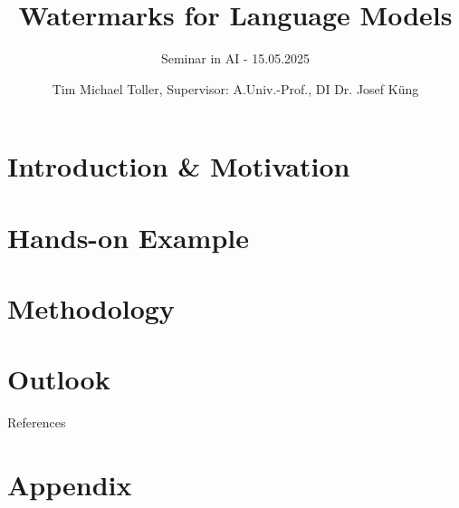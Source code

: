\documentclass[utf8,aspectratio=169,ngerman,english]{beamer}
\begin{document}
\title{Watermarks for Language Models}
\subtitle{Seminar in AI - 15.05.2025}


\author{Tim Michael Toller, Supervisor: A.Univ.-Prof., DI Dr. Josef Küng}

\date[15.05.2025]{} %
\footerdate{}
\maketitle


\section{Introduction \& Motivation}

\section{Hands-on Example}


\section{Methodology}


\section{Outlook}


\begin{frame}[allowframebreaks]{References}
    \AtNextBibliography{\footnotesize}
    \printbibliography
\end{frame}

\jkulogo
\section{Appendix}
\end{document}

